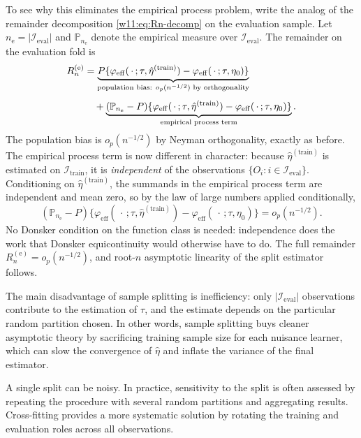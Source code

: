 \documentclass[master.tex]{subfiles}
\begin{document}
To see why this eliminates the empirical process problem, write the
analog of the remainder decomposition \eqref{w11:eq:Rn-decomp} on
the evaluation sample.  Let $n_{\mathrm{e}} = |\mathcal{I}_{\mathrm{eval}}|$
and $\mathbb{P}_{n_{\mathrm{e}}}$ denote the empirical measure over
$\mathcal{I}_{\mathrm{eval}}$.  The remainder on the evaluation fold is
\begin{align}
  R_n^{(\mathrm{e})}
  &=
  \underbrace{%
    P\{
      \varphi_{\mathrm{eff}}(\,\cdot\,;\tau,\hat\eta^{(\mathrm{train})})
      - \varphi_{\mathrm{eff}}(\,\cdot\,;\tau,\eta_0)
    \}
  }_{\text{population bias: } o_p(n^{-1/2}) \text{ by orthogonality}}
  \nonumber\\[4pt]
  &\quad+
  \underbrace{%
    (\mathbb{P}_{n_{\mathrm{e}}} - P)\{
      \varphi_{\mathrm{eff}}(\,\cdot\,;\tau,\hat\eta^{(\mathrm{train})})
      - \varphi_{\mathrm{eff}}(\,\cdot\,;\tau,\eta_0)
    \}
  }_{\text{empirical process term}}.
  \label{w11:eq:split-decomp}
\end{align}
The population bias is $o_p(n^{-1/2})$ by Neyman orthogonality,
exactly as before.  The empirical process term is now different in
character: because $\hat\eta^{(\mathrm{train})}$ is estimated on
$\mathcal{I}_{\mathrm{train}}$, it is \emph{independent} of the
observations $\{O_i : i \in \mathcal{I}_{\mathrm{eval}}\}$.
Conditioning on $\hat\eta^{(\mathrm{train})}$, the summands in the
empirical process term are independent and mean zero, so by the law
of large numbers applied conditionally,
\[
  (\mathbb{P}_{n_{\mathrm{e}}} - P)\{
    \varphi_{\mathrm{eff}}(\,\cdot\,;\tau,\hat\eta^{(\mathrm{train})})
    - \varphi_{\mathrm{eff}}(\,\cdot\,;\tau,\eta_0)
  \}
  = o_p(n^{-1/2}).
\]
No Donsker condition on the function class is needed: independence
does the work that Donsker equicontinuity would otherwise have to do.
The full remainder $R_n^{(\mathrm{e})} = o_p(n^{-1/2})$, and
root-$n$ asymptotic linearity of the split estimator follows.

The main disadvantage of sample splitting is inefficiency: only
$|\mathcal{I}_{\mathrm{eval}}|$ observations contribute to the
estimation of $\tau$, and the estimate depends on the particular
random partition chosen.  In other words, sample splitting buys
cleaner asymptotic theory by sacrificing training sample size for
each nuisance learner, which can slow the convergence of $\hat\eta$
and inflate the variance of the final estimator.

\begin{remark}
\label{w11:rem:split-noise}
A single split can be noisy.  In practice, sensitivity to the split
is often assessed by repeating the procedure with several random
partitions and aggregating results.  Cross-fitting provides a more
systematic solution by rotating the training and evaluation roles
across all observations.
\end{remark}
\end{document}
